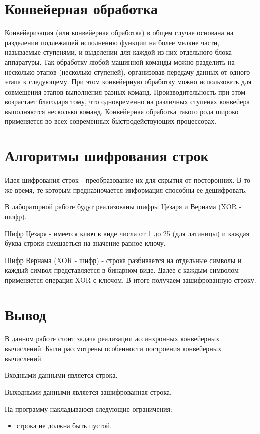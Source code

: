 \documentclass[12pt,a4paper]{report}
\begin{document}
\section{Конвейерная обработка}

Конвейеризация (или конвейерная обработка) в общем случае основана на разделении подлежащей исполнению функции на более мелкие части, называемые ступенями, и выделении для каждой из них отдельного блока аппаратуры. Так обработку любой машинной команды можно разделить на несколько этапов (несколько ступеней), организовав передачу данных от одного этапа к следующему. При этом конвейерную обработку можно использовать для совмещения этапов выполнения разных команд. Производительность при этом возрастает благодаря тому, что одновременно на различных ступенях конвейера выполняются несколько команд. Конвейерная обработка такого рода широко применяется во всех современных быстродействующих процессорах.

\section{Алгоритмы шифрования строк}

Идея шифрования строк - преобразование их для скрытия от посторонних. В то же время,  те которым предназночается информация способны ее дешифровать.

В лабораторной работе будут реализованы шифры Цезаря и Вернама (XOR - шифр).

Шифр Цезаря - имеется ключ в виде числа от 1 до 25 (для латиницы) и каждая буква строки смещаеться на значение равное ключу.

Шифр Вернама (XOR - шифр) - строка разбивается на отдельные символы и каждый символ представляется в бинарном виде. Далее с каждым символом применяется операция XOR с ключом. В итоге получаем зашифрованную строку.

\section*{Вывод}
В данном работе стоит задача реализации ассинхронных конвейерных вычислений. Были рассмотрены особенности построения конвейерных вычислений.

Входными данными является строка.

Выходными данными является зашифрованная строка.

На программу накладываюся следующие ограничения:
\begin{itemize}
	\item строка не должна быть пустой.
\end{itemize}
\end{document}
